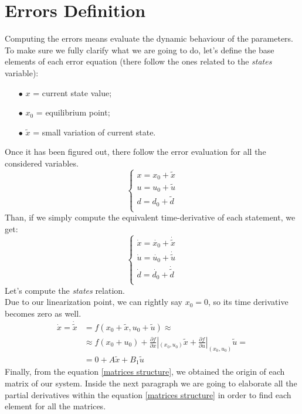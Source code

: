 \section{Errors Definition}
	Computing the errors means evaluate the dynamic behaviour of the parameters. To make sure we fully clarify what we are going to do, let's define the base elements of each error equation (there follow the ones related to the \textit{states} variable):
		\begin{itemize}
			\item[$\bullet$] $x$ = current state value;
			\item[$\bullet$] $x_{0}$ = equilibrium point;
			\item[$\bullet$] $\tilde{x}$ = small variation of current state.
		\end{itemize}
	Once it has been figured out, there follow the error evaluation for all the considered variables.
		\begin{equation*}
			\begin{cases}
				x = x_{0} + \tilde{x} \\
				u = u_{0} + \tilde{u} \\
				d = d_{0} + \tilde{d} \\
			\end{cases}
		\end{equation*}
	Than, if we simply compute the equivalent time-derivative of each statement, we get:
		\begin{equation*}
			\begin{cases}
				\dot{x} = \dot{x_{0}} + \dot{\tilde{x}} \\
				\dot{u} = \dot{u_{0}} + \dot{\tilde{u}} \\
				\dot{d} = \dot{d_{0}} + \dot{\tilde{d}} \\
			\end{cases}
		\end{equation*}
	Let's compute the \textit{states} relation.\\
	Due to our linearization point, we can rightly say $x_{0} = 0 $, so its time derivative becomes zero as well.
		\begin{equation} \label{matrices structure}
			\begin{split}
				\dot{x}  = \dot{\tilde{x}} &= f(x_{0}+\tilde{x},u_{0}+\tilde{u})\approx \\
				&\approx f(x_{0}+u_{0}) + \frac{\partial f}{\partial x} |_{(x_{0},u_{0})} \tilde{x} + \frac{\partial f}{\partial u} |_{(x_{0},u_{0})} \tilde{u} = \\
				&= 0 + A \tilde{x} + B_{1} \tilde{u}
			\end{split}
		\end{equation}
	Finally, from the equation \ref{matrices structure}, we obtained the origin of each matrix of our system. Inside the next paragraph we are going to elaborate all the partial derivatives within the equation \ref{matrices structure} in order to find each element for all the matrices.

